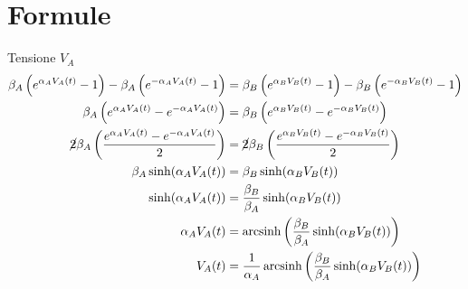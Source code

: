 	\chapter{Formule}
		Tensione $V_{A}$
		\begin{equation}
			\label{eq:corrente}
			\begin{split}
				\beta_{A}\left(e^{\alpha_{A}V_{A}(t)}-1\right)-\beta_{A}\left(e^{-\alpha_{A}V_{A}(t)}-1\right) &= \beta_{B}\left(e^{\alpha_{B}V_{B}(t)}-1\right)-\beta_{B}\left(e^{-\alpha_{B}V_{B}(t)}-1\right)\\
				\beta_{A}\left(e^{\alpha_{A}V_{A}(t)}-e^{-\alpha_{A}V_{A}(t)}\right) &= \beta_{B}\left(e^{\alpha_{B}V_{B}(t)}-e^{-\alpha_{B}V_{B}(t)}\right)\\
				\cancel{2}\beta_{A}\left(\frac{e^{\alpha_{A}V_{A}(t)}-e^{-\alpha_{A}V_{A}(t)}}{2}\right) &= \cancel{2}\beta_{B}\left(\frac{e^{\alpha_{B}V_{B}(t)}-e^{-\alpha_{B}V_{B}(t)}}{2}\right)\\
				\beta_{A} \sinh(\alpha_{A}V_{A}(t)) &= \beta_{B} \sinh(\alpha_{B}V_{B}(t))\\
				\sinh(\alpha_{A}V_{A}(t)) &= \frac{\beta_{B}}{\beta_{A}} \sinh(\alpha_{B}V_{B}(t))\\
				\alpha_{A}V_{A}(t) &= \operatorname{arcsinh} \left(\frac{\beta_{B}}{\beta_{A}} \sinh(\alpha_{B}V_{B}(t))\right)\\
				V_{A}(t) &= \frac{1}{\alpha_{A}} \operatorname{arcsinh} \left(\frac{\beta_{B}}{\beta_{A}} \sinh(\alpha_{B}V_{B}(t))\right)
			\end{split}
		\end{equation}
		
